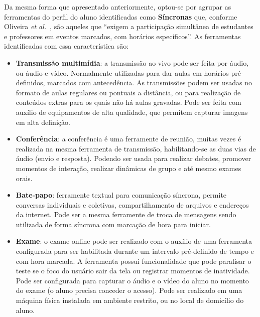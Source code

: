 
Da mesma forma que apresentado anteriormente, optou-se por agrupar as ferramentas do perfil do aluno identificadas como \textbf{Síncronas} que, conforme Oliveira \textit{et al.}~\cite{dotta@ead}, são aqueles que ``exigem a participação simultânea de estudantes e professores em eventos marcados, com horários específicos''. As ferramentas identificadas com essa característica são:
\label{sub:sinc}

\begin{itemize}
\item \textbf{Transmissão multimídia}: a transmissão ao vivo pode ser feita por áudio, ou áudio e vídeo. Normalmente utilizadas para dar aulas em horários pré-definidos, marcados com antecedência. As transmissões podem ser usadas no formato de aulas regulares ou pontuais a distância, ou para realização de conteúdos extras para os quais não há aulas gravadas. Pode ser feita com auxílio de equipamentos de alta qualidade, que permitem capturar imagens em alta definição.
\item \textbf{Conferência}: a conferência é uma ferramente de reunião, muitas vezes é realizada na mesma ferramenta de transmissão, habilitando-se as duas vias de áudio (envio e resposta). Podendo ser usada para realizar debates, promover momentos de interação, realizar dinâmicas de grupo e até mesmo exames orais.
\item \textbf{Bate-papo}: ferramente textual para comunicação síncrona, permite conversas individuais e coletivas, compartilhamento de arquivos e endereços da internet. Pode ser a mesma ferramente de troca de mensagens sendo utilizada de forma síncrona com marcação de hora para iniciar.
\item \textbf{Exame}: o exame online pode ser realizado com o auxílio de uma ferramenta configurada para ser habilitada durante um intervalo pré-definido de tempo e com hora marcada. A ferramenta possui funcionalidade que pode paralisar o teste se o foco do usuário sair da tela ou registrar momentos de inatividade. Pode ser configurada para capturar o áudio e o vídeo do aluno no momento do exame (o aluno precisa conceder o acesso). Pode ser realizado em uma máquina física instalada em ambiente restrito, ou no local de domicílio do aluno.
\end{itemize}

